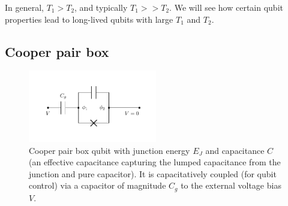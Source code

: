\documentclass[11pt]{article}
\begin{document}
In general, $T_1 > T_2$, and typically $T_1 >> T_2$. We will see how certain qubit properties lead to long-lived qubits with large $T_1$ and $T_2$.




\subsection{Cooper pair box}

\begin{figure}[H]
	\centering
	\includegraphics[trim={0cm 1cm 0cm 1cm}, clip, width=0.5\textwidth]{cpb.pdf}
	\caption{Cooper pair box qubit with junction energy $E_J$ and capacitance $C$ (an effective capacitance capturing the lumped capacitance from the junction and pure capacitor). It is capacitatively coupled (for qubit control) via a capacitor of magnitude $C_g$ to the external voltage bias $V$.}
	\label{fig_cpb}
\end{figure}
\end{document}
